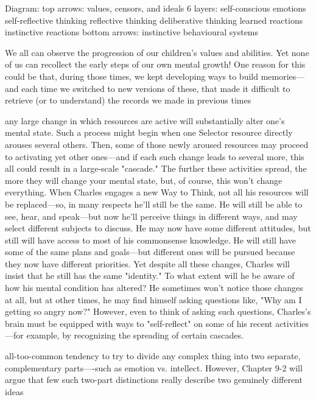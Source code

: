 \documentclass[10pt,a4paper]{article}
\begin{document}
Diagram:
top arrows: values, censors, and ideals
6 layers:
self-conscious emotions
self-reflective thinking
reflective thinking
deliberative thinking
learned reactions
instinctive reactions
bottom arrows: instinctive behavioural systems \cite[p.~29]{minsky}

We all can observe the progression of our children's values and abilities. Yet none of us can recollect the early steps of our own mental growth! One reason for this could be that, during those times, we kept developing ways to build memories—and each time we switched to new versions of these, that made it difficult to retrieve (or to understand) the records we made in previous times \cite[p.~30]{minsky}

any large change in which resources are active will substantially alter one's mental state. Such a process might begin when one Selector resource directly arouses several others. Then, some of those newly aroused resources may proceed to activating yet other ones—and if each such change leads to several more, this all could result in a large-scale "cascade." The further these activities spread, the more they will change your mental state, but, of course, this won't change everything. When Charles engages a new Way to Think, not all his resources will be replaced—so, in many respects he'll still be the same. He will still be able to see, hear, and speak—but now he'll perceive things in different ways, and may select different subjects to discuss. He may now have some different attitudes, but still will have access to most of his commonsense knowledge. He will still have some of the same plans and goals—but different ones will be pursued because they now have different priorities. Yet despite all these changes, Charles will insist that he still has the same "identity." To what extent will he be aware of how his mental condition has altered? He sometimes won't notice those changes at all, but at other times, he may find himself asking questions like, "Why am I getting so angry now?" However, even to think of asking such questions, Charles's brain must be equipped with ways to "self-reflect" on some of his recent activities—for example, by recognizing the spreading of certain cascades. \cite[p.~31-32]{minsky}

all-too-common tendency to try to divide any complex thing into two separate, complementary parts—-such as emotion vs. intellect. However, Chapter 9-2 will argue that few such two-part distinctions really describe two genuinely different ideas \cite[p.~33]{minsky}
\end{document}
